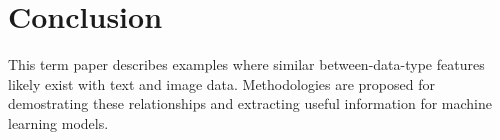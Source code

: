 \section{Conclusion}

This term paper describes examples where similar between-data-type features likely exist with text and image data.  Methodologies are proposed for demostrating these relationships and extracting useful information for machine learning models.  
